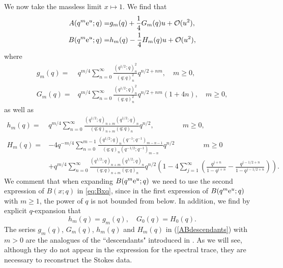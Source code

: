 \documentclass[a4paper,11pt]{article}
\theoremstyle{definition}
\newcommand{\CO}{{\cal O}}
\newcommand{\re}{{\rm e}}
\newcommand{\nn}{\nonumber \\}
\begin{document}
We now take the massless limit $x\mapsto 1$.  We find that
%
\begin{subequations}
\label{ABdescendants}
\begin{align}
  A(q^m\re^{u};q) =
  &g_m(q)+\frac{1}{4}G_m(q) u + \CO(u^2),\\
  B(q^m\re^{u};q) =
  &h_m(q)-\frac{1}{4}H_m(q) u + \CO(u^2),
\end{align}
\end{subequations}
%
where
%
\begin{subequations}
\begin{align}
  g_m(q) =
  &q^{m/4}\sum_{n=0}^\infty
    \frac{(q^{1/2};q)_n^2}{(q;q)_n^2}q^{n/2+nm},\quad m\geq 0,\\
  G_m(q) =
  &q^{m/4}\sum_{n=0}^\infty
    \frac{(q^{1/2};q)_n^2}{(q;q)_n^2}q^{n/2+nm}(1+4n),\quad m\geq 0,
\end{align}
\end{subequations}
%
as well as
%
\begin{subequations}
\begin{align}
  h_m(q) =
  &q^{m/4}\sum_{n=0}^\infty
    \frac{(q^{1/2};q)_{n+m}(q^{1/2};q)_n}{(q;q)_{n+m}(q;q)_n}q^{n/2},
  \qquad\qquad m\geq 0,\\
  H_m(q) =
  &-4q^{-m/4}\sum_{n=0}^{m-1}
    \frac{(q^{1/2};q)_n(q^{-1};q^{-1})_{m-n-1}}
    {(q;q)_n(q^{-1/2};q^{-1})_{m-n}}q^{n/2}\qquad\qquad m \geq 0\nn
  &+q^{m/4}\sum_{n=0}^\infty
    \frac{(q^{1/2};q)_{n+m}(q^{1/2};q)_n}{(q;q)_{n+m}(q;q)_n}
    q^{n/2}\left(1-4\sum_{j=1}^\infty\left(
    \frac{q^{j+n}}{1-q^{j+n}} - \frac{q^{j-1/2+n}}{1-q^{j-1/2+n}}
    \right)\right).
\end{align}
\end{subequations}
We comment that when expanding $B(q^m\re^u;q)$ we need to use the
second expression of $B(x;q)$ in \eqref{eq:Bxq}, since in the first expression of $B(q^m\re^u;q)$ with
$m\geq 1$, the power of $q$ is not bounded from below. In addition, we find by explicit $q$-expansion that
%
\begin{equation}
  h_m(q) = g_m(q),\quad G_0(q) = H_0(q).
\end{equation}
%
The series $g_m(q)$, $G_m(q)$, $h_m(q)$ and $H_m(q)$ in (\ref{ABdescendants}) with $m>0$ are the analogues of the ``descendants" 
introduced in \cite{ggm1,ggm2}. As we will see, although they do not appear in the expression for the spectral trace, they are necessary to 
reconstruct the Stokes data. 
\end{document}
